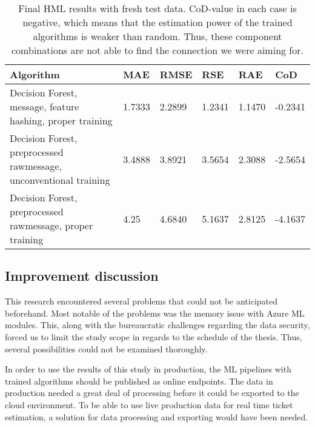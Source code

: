 \begin{table}[htb]
    \begin{tabularx}{\textwidth}{|Y|L{0.10\textwidth}|L{0.10\textwidth}|L{0.08\textwidth}|L{0.08\textwidth}|L{0.1\textwidth}|}
        \hline
        \textbf{Algorithm} &
        \textbf{MAE} &
        \textbf{RMSE} &
        \textbf{RSE} &
        \textbf{RAE} &
        \textbf{CoD} \\ \hline
        Decision Forest, message, feature hashing, proper training              & 1.7333		& 2.2899		& 1.2341		& 1.1470		& -0.2341   \\
        \hline
        Decision Forest, preprocessed rawmessage, unconventional training       & 3.4888		& 3.8921		& 3.5654		& 2.3088		& -2.5654	\\
        \hline
        Decision Forest, preprocessed rawmessage, proper training               & 4.25		    & 4.6840		& 5.1637		& 2.8125		& -4.1637 	\\
        \hline
    \end{tabularx}
    \caption{Final HML results with fresh test data.
    CoD-value in each case is negative,
        which means that the estimation power of the trained algorithms is weaker than random.
        Thus, these component combinations are not able to find the connection we were aiming for.
    }
    \label{tab:final-results}
\end{table}





\subsection{Improvement discussion}\label{subsec:discussion}

This research encountered several problems
that could not be anticipated beforehand.
Most notable of the problems was the memory issue
with Azure ML modules.
This,
along with the bureaucratic challenges regarding the data security,
forced us to limit the study scope in regards to the schedule of the thesis.
Thus,
several possibilities could not be examined thoroughly.

In order to use the results of this study in production,
the ML pipelines with trained algorithms should be published as online endpoints.
The data in production needed a great deal of processing before
it could be exported to the cloud environment.
To be able to use live production data for real time ticket estimation,
a solution for data processing and exporting would have been needed.

